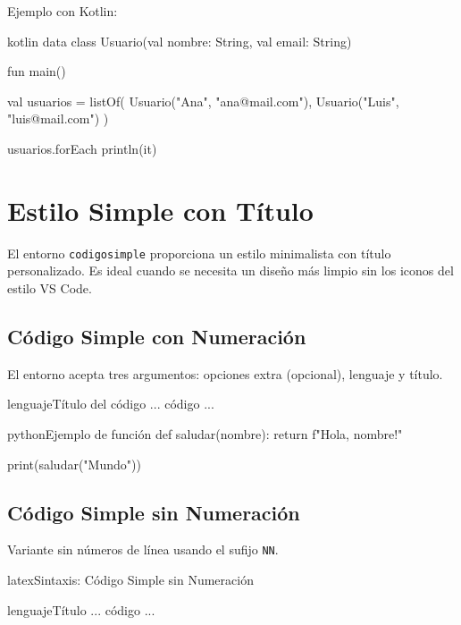 Ejemplo con Kotlin:

\begin{codigoDark}{kotlin}
data class Usuario(val nombre: String, val email: String)

fun main() {
    val usuarios = listOf(
        Usuario("Ana", "ana@mail.com"),
        Usuario("Luis", "luis@mail.com")
    )

    usuarios.forEach { println(it) }
}
\end{codigoDark}

\section{Estilo Simple con Título}
\label{sec:codigosimple}

El entorno \texttt{codigosimple} proporciona un estilo minimalista con título personalizado.
Es ideal cuando se necesita un diseño más limpio sin los iconos del estilo VS Code.

\subsection{Código Simple con Numeración}

El entorno acepta tres argumentos: opciones extra (opcional), lenguaje y título.

\begin{bashcode}[title={Sintaxis}]
\begin{codigosimple}{lenguaje}{Título del código}
  ... código ...
\end{codigosimple}
\end{bashcode}

\begin{codigosimple}{python}{Ejemplo de función}
def saludar(nombre):
    return f"Hola, {nombre}!"

print(saludar("Mundo"))
\end{codigosimple}

\subsection{Código Simple sin Numeración}

Variante sin números de línea usando el sufijo \texttt{NN}.

\begin{codigosimple}{latex}{Sintaxis: Código Simple sin Numeración}
\begin{codigosimpleNN}{lenguaje}{Título}
  ... código ...
\end{codigosimpleNN}
\end{codigosimple}

